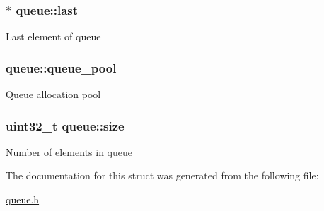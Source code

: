 \subsubsection[{last}]{$\ast$ queue\+::last}\label{structqueue_aae654629b98bc351a1d413d33d8bd73d}
Last element of queue \hypertarget{structqueue_a89eaf220ffbbf852f27514573277da75}{}
\subsubsection[{queue\+\_\+pool}]{ queue\+::queue\+\_\+pool}\label{structqueue_a89eaf220ffbbf852f27514573277da75}
Queue allocation pool \hypertarget{structqueue_a10ade3b6049d30b7c2ace7e0a6e12a4d}{}
\subsubsection[{size}]{\setlength{\rightskip}{0pt plus 5cm}uint32\+\_\+t queue\+::size}\label{structqueue_a10ade3b6049d30b7c2ace7e0a6e12a4d}
Number of elements in queue 

The documentation for this struct was generated from the following file\+:\begin{DoxyCompactItemize}
\item 
\hyperlink{queue_8h}{queue.\+h}\end{DoxyCompactItemize}

